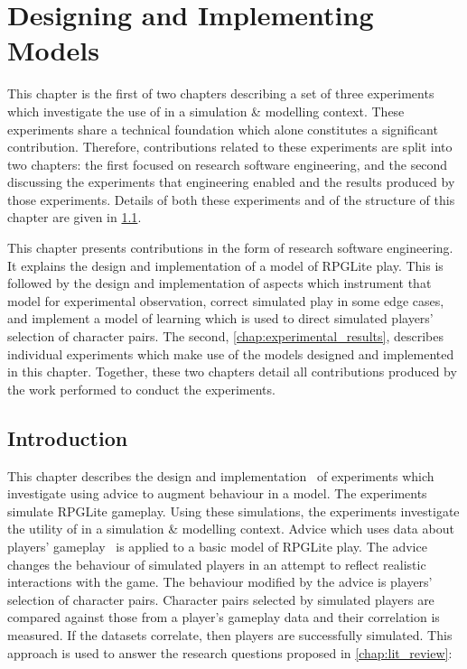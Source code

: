 \chapter{Designing and Implementing \AspectOriented{} Models}
\label{chap:exp1_simulation_optimisation}
\label{chap:experiment_setup}

This chapter is the first of two chapters describing a set of three experiments
which investigate the use of \aop{} in a simulation \& modelling context. These
experiments share a technical foundation which alone constitutes a significant
contribution. Therefore, contributions related to these experiments are split
into two chapters: the first focused on research software engineering, and the
second discussing the experiments that engineering enabled and the results
produced by those experiments. Details of both these experiments and of the
structure of this chapter are given in
\cref{intro-to-first-experimental-chapter}.

This chapter presents contributions in the form of research software
engineering. It explains the design and implementation of a model of RPGLite
play. This is followed by the design and implementation of aspects which
instrument that model for experimental observation, correct simulated play in
some edge cases, and implement a model of learning which is used to direct
simulated players' selection of character pairs. The second,
\cref{chap:experimental_results}, describes individual experiments which make
use of the \aspectoriented models designed and implemented in this chapter.
Together, these two chapters detail all contributions produced by the work
performed to conduct the experiments.

\section{Introduction}
\label{intro-to-first-experimental-chapter}

This chapter describes the design and
implementation~\cite{rpglite_analysis_and_experiments_repo} of experiments which
investigate using advice to augment behaviour in a model. The experiments
simulate RPGLite gameplay. Using these simulations, the experiments investigate
the utility of \aop{} in a simulation \& modelling context. Advice which uses
data about players' gameplay~\cite{rpglite_dataset} is applied to a basic model
of RPGLite play. The advice changes the behaviour of simulated players in an
attempt to reflect realistic interactions with the game. The behaviour modified
by the advice is players' selection of character pairs. Character pairs selected
by simulated players are compared against those from a player's gameplay data
and their correlation is measured. If the datasets correlate, then players are
successfully simulated. This approach is used to answer the research questions
proposed in \cref{chap:lit_review}: 


